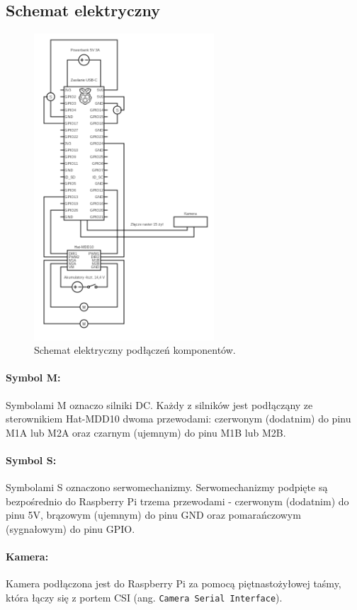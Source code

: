 \documentclass[a4paper,twoside,12pt]{book}
\begin{document}
\newpage
\subsection{Schemat elektryczny}
\begin{figure}[h]
    \centering
    \includegraphics[width=0.6\textwidth]{Images/Schemat elektryczny/circuit.png}
    \caption{Schemat elektryczny podłączeń komponentów.}
    \label{fig:Schemat elektryczny}
\end{figure}
\newpage
\paragraph{Symbol M:} Symbolami M oznaczo silniki DC. Każdy z silników jest podłącząny ze sterownikiem Hat-MDD10 dwoma przewodami: czerwonym (dodatnim) do pinu M1A lub M2A oraz czarnym (ujemnym) do pinu M1B lub M2B.
\paragraph{Symbol S:} Symbolami S oznaczono serwomechanizmy. Serwomechanizmy podpięte są bezpośrednio do Raspberry Pi trzema przewodami - czerwonym (dodatnim) do pinu 5V, brązowym (ujemnym) do pinu GND oraz pomarańczowym (sygnałowym) do pinu GPIO.
\paragraph{Kamera:} Kamera podłączona jest do Raspberry Pi za pomocą piętnastożyłowej taśmy, która łączy się z portem CSI (ang. \texttt{Camera Serial Interface}).
\end{document}
